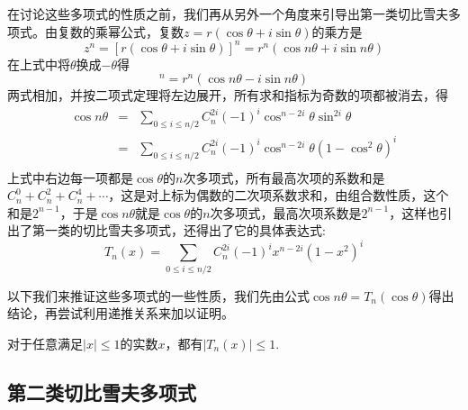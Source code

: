 在讨论这些多项式的性质之前，我们再从另外一个角度来引导出第一类切比雪夫多项式。由复数的乘幂公式，复数$z=r(\cos{\theta}+i\sin{\theta})$的乘方是
\begin{equation*}
  z^n=[r(\cos{\theta}+i\sin{\theta})]^n = r^n(\cos{n\theta}+i\sin{n\theta})
\end{equation*}
在上式中将$\theta$换成$-\theta$得
\begin{equation*}
  [r(\cos{\theta}-i\sin{\theta})]^n = r^n(\cos{n\theta}-i\sin{n\theta})
\end{equation*}
两式相加，并按二项式定理将左边展开，所有求和指标为奇数的项都被消去，得
\begin{eqnarray*}
  \cos{n\theta} & = & \sum_{0 \leqslant i \leqslant n/2}C_n^{2i}(-1)^i\cos^{n-2i}{\theta}\sin^{2i}{\theta} \\
  & = & \sum_{0 \leqslant i \leqslant n/2}C_n^{2i}(-1)^i\cos^{n-2i}{\theta}(1-\cos^2{\theta})^i \\
\end{eqnarray*}
上式中右边每一项都是$\cos{\theta}$的$n$次多项式，所有最高次项的系数和是$C_n^0+C_n^2+C_n^4+\cdots$，这是对上标为偶数的二次项系数求和，由组合数性质，这个和是$2^{n-1}$，于是$\cos{n\theta}$就是$\cos{\theta}$的$n$次多项式，最高次项系数是$2^{n-1}$，这样也引出了第一类的切比雪夫多项式，还得出了它的具体表达式:
\begin{equation*}
  T_n(x) = \sum_{0 \leqslant i \leqslant n/2}C_n^{2i}(-1)^ix^{n-2i}(1-x^2)^{i}
\end{equation*}

以下我们来推证这些多项式的一些性质，我们先由公式$\cos{n\theta}=T_n(\cos{\theta})$得出结论，再尝试利用递推关系来加以证明。

\begin{property}
  对于任意满足$|x|\leqslant 1$的实数$x$，都有$|T_n(x)| \leqslant 1$.
\end{property}



\subsection{第二类切比雪夫多项式}
\label{sec:second-chebyshev-polynome}

